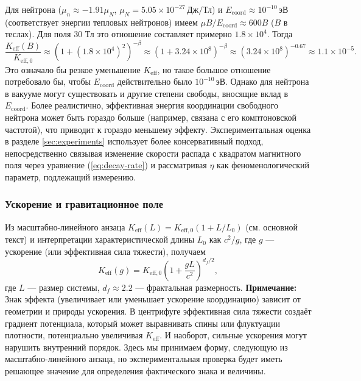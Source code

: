 \documentclass[12pt]{article}
\theoremstyle{remark}
\newcommand{\Keff}{K_{\mathrm{eff}}}
\newcommand{\Keffzero}{K_{\mathrm{eff},0}}
\newcommand{\df}{d_{\!f}}
\begin{document}
	Для нейтрона (\(\mu_n \approx -1.91\mu_N\), \(\mu_N = 5.05\times 10^{-27}\,\text{Дж/Тл}\)) и \(E_{\mathrm{coord}} \approx 10^{-10}\,\text{эВ}\) (соответствует энергии тепловых нейтронов) имеем \(\mu B / E_{\mathrm{coord}} \approx 600 B\) (\(B\) в теслах). Для поля 30 Тл это отношение составляет примерно \(1.8\times10^4\). Тогда
	\[
	\frac{\Keff(B)}{\Keffzero} \approx (1 + (1.8\times10^4)^2)^{-\beta} \approx (1 + 3.24\times10^8)^{-\beta} \approx (3.24\times10^8)^{-0.67} \approx 1.1\times10^{-5}.
	\]
	Это означало бы резкое уменьшение \(\Keff\), но такое большое отношение потребовало бы, чтобы \(E_{\mathrm{coord}}\) действительно было \(10^{-10}\,\text{эВ}\). Однако для нейтрона в вакууме могут существовать и другие степени свободы, вносящие вклад в \(E_{\mathrm{coord}}\). Более реалистично, эффективная энергия координации свободного нейтрона может быть гораздо больше (например, связана с его комптоновской частотой), что приводит к гораздо меньшему эффекту. Экспериментальная оценка в разделе \ref{sec:experiments} использует более консервативный подход, непосредственно связывая изменение скорости распада с квадратом магнитного поля через уравнение (\ref{eq:decay-rate}) и рассматривая \(\eta\) как феноменологический параметр, подлежащий измерению.
	
	\subsubsection{Ускорение и гравитационное поле}
	
	Из масштабно-линейного анзаца \(\Keff(L) = \Keffzero (1 + L/L_0)\) (см. основной текст) и интерпретации характеристической длины \(L_0\) как \(c^2/g\), где \(g\) — ускорение (или эффективная сила тяжести), получаем
	\begin{equation}
		\Keff(g) = \Keffzero \left(1 + \frac{gL}{c^2}\right)^{\df/2},
		\label{eq:keff-g}
	\end{equation}
	где \(L\) — размер системы, \(\df \approx 2.2\) — фрактальная размерность. \textbf{Примечание:} Знак эффекта (увеличивает или уменьшает ускорение координацию) зависит от геометрии и природы ускорения. В центрифуге эффективная сила тяжести создаёт градиент потенциала, который может выравнивать спины или флуктуации плотности, потенциально увеличивая \(\Keff\). И наоборот, сильные ускорения могут нарушить внутренний порядок. Здесь мы принимаем форму, следующую из масштабно-линейного анзаца, но экспериментальная проверка будет иметь решающее значение для определения фактического знака и величины.
	
\end{document}
